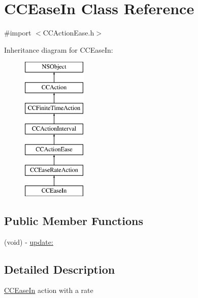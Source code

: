 \hypertarget{interface_c_c_ease_in}{\section{C\-C\-Ease\-In Class Reference}
\label{interface_c_c_ease_in}
}


{\ttfamily \#import $<$C\-C\-Action\-Ease.\-h$>$}

Inheritance diagram for C\-C\-Ease\-In\-:\begin{figure}[H]
\begin{center}
\leavevmode
\includegraphics[height=7.000000cm]{interface_c_c_ease_in}
\end{center}
\end{figure}
\subsection*{Public Member Functions}
\begin{DoxyCompactItemize}
\item 
(void) -\/ \hyperlink{interface_c_c_ease_in_aff18692a06ac70b5a5f5ec5fb272bf2c}{update\-:}
\end{DoxyCompactItemize}


\subsection{Detailed Description}
\hyperlink{interface_c_c_ease_in}{C\-C\-Ease\-In} action with a rate 

